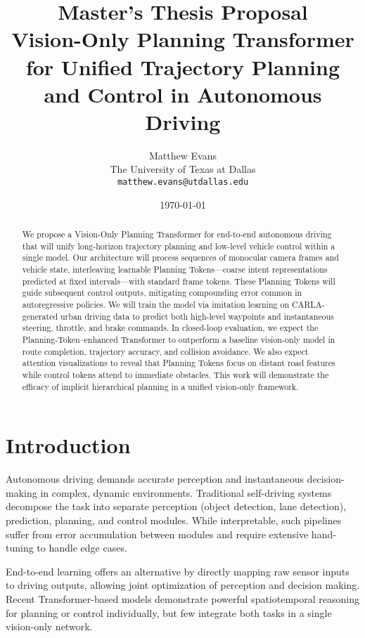 \documentclass[11pt,a4paper]{article}
\title{Master's Thesis Proposal\\\Large{Vision-Only Planning Transformer for Unified Trajectory Planning and Control in Autonomous Driving}}
\author{Matthew Evans \\ The University of Texas at Dallas \\ \texttt{matthew.evans@utdallas.edu}}
\date{\today}
\begin{document}
\maketitle

\begin{abstract}
    We propose a Vision-Only Planning Transformer for end-to-end autonomous driving that will unify long-horizon trajectory planning and low-level vehicle control within a single model. Our architecture will process sequences of monocular camera frames and vehicle state, interleaving learnable Planning Tokens—coarse intent representations predicted at fixed intervals—with standard frame tokens. These Planning Tokens will guide subsequent control outputs, mitigating compounding error common in autoregressive policies. We will train the model via imitation learning on CARLA-generated urban driving data to predict both high-level waypoints and instantaneous steering, throttle, and brake commands. In closed-loop evaluation, we expect the Planning-Token–enhanced Transformer to outperform a baseline vision-only model in route completion, trajectory accuracy, and collision avoidance. We also expect attention visualizations to reveal that Planning Tokens focus on distant road features while control tokens attend to immediate obstacles. This work will demonstrate the efficacy of implicit hierarchical planning in a unified vision-only framework.
\end{abstract}


\section*{Introduction}

Autonomous driving demands accurate perception and instantaneous decision-making in complex, dynamic environments. Traditional self-driving systems decompose the task into separate perception (object detection, lane detection), prediction, planning, and control modules. While interpretable, such pipelines suffer from error accumulation between modules and require extensive hand-tuning to handle edge cases.

End-to-end learning offers an alternative by directly mapping raw sensor inputs to driving outputs, allowing joint optimization of perception and decision making. Recent Transformer-based models demonstrate powerful spatiotemporal reasoning for planning or control individually, but few integrate both tasks in a single vision-only network.
\end{document}
